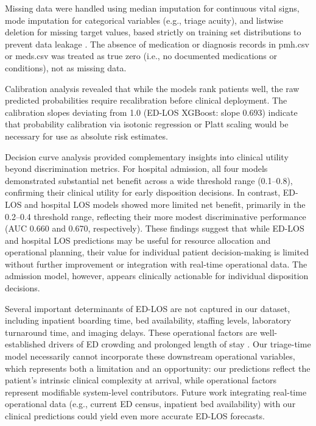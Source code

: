 \documentclass[harvard,article]{frontiersinFPHY_FAMS}
\begin{document}
Missing data were handled using median imputation for continuous vital signs, mode imputation for categorical variables (e.g., triage acuity), and listwise deletion for missing target values, based strictly on training set distributions to prevent data leakage \cite{huang2022, enshaei2024}. The absence of medication or diagnosis records in pmh.csv or meds.csv was treated as true zero (i.e., no documented medications or conditions), not as missing data.

Calibration analysis revealed that while the models rank patients well, the raw predicted probabilities require recalibration before clinical deployment. The calibration slopes deviating from 1.0 (ED-LOS XGBoost: slope 0.693) indicate that probability calibration via isotonic regression or Platt scaling would be necessary for use as absolute risk estimates.

Decision curve analysis provided complementary insights into clinical utility beyond discrimination metrics. For hospital admission, all four models demonstrated substantial net benefit across a wide threshold range (0.1--0.8), confirming their clinical utility for early disposition decisions. In contrast, ED-LOS and hospital LOS models showed more limited net benefit, primarily in the 0.2--0.4 threshold range, reflecting their more modest discriminative performance (AUC 0.660 and 0.670, respectively). These findings suggest that while ED-LOS and hospital LOS predictions may be useful for resource allocation and operational planning, their value for individual patient decision-making is limited without further improvement or integration with real-time operational data. The admission model, however, appears clinically actionable for individual disposition decisions.

Several important determinants of ED-LOS are not captured in our dataset, including inpatient boarding time, bed availability, staffing levels, laboratory turnaround time, and imaging delays. These operational factors are well-established drivers of ED crowding and prolonged length of stay \cite{morley2018, pines2011}. Our triage-time model necessarily cannot incorporate these downstream operational variables, which represents both a limitation and an opportunity: our predictions reflect the patient's intrinsic clinical complexity at arrival, while operational factors represent modifiable system-level contributors. Future work integrating real-time operational data (e.g., current ED census, inpatient bed availability) with our clinical predictions could yield even more accurate ED-LOS forecasts.
\end{document}
